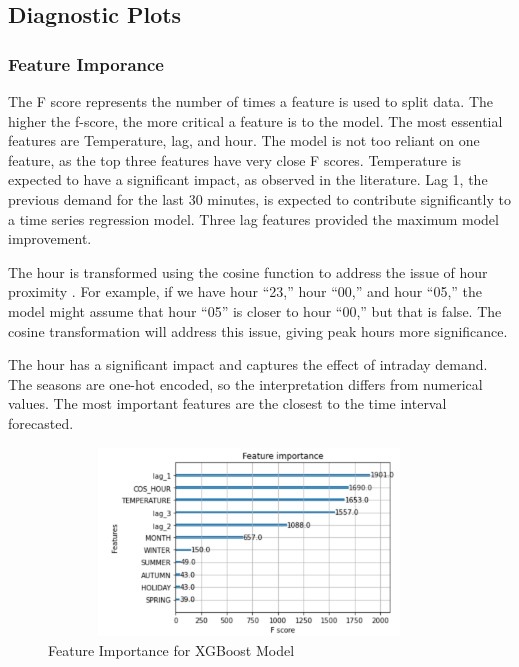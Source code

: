 \documentclass[mstat,12pt]{unswthesis}
\begin{document}
\subsection{Diagnostic Plots}\label{diagnostic-plots}

\subsubsection{Feature Imporance}\label{feature-imporance}

The F score represents the number of times a feature is used to split
data. The higher the f-score, the more critical a feature is to the
model. The most essential features are Temperature, lag, and hour. The
model is not too reliant on one feature, as the top three features have
very close F scores. Temperature is expected to have a significant
impact, as observed in the literature. Lag 1, the previous demand for
the last 30 minutes, is expected to contribute significantly to a time
series regression model. Three lag features provided the maximum model
improvement.

The hour is transformed using the cosine function to address the issue
of hour proximity \cite{avanwyk_2022_encoding}. For example, if we have
hour ``23,'' hour ``00,'' and hour ``05,'' the model might assume that
hour ``05'' is closer to hour ``00,'' but that is false. The cosine
transformation will address this issue, giving peak hours more
significance.

The hour has a significant impact and captures the effect of intraday
demand. The seasons are one-hot encoded, so the interpretation differs
from numerical values. The most important features are the closest to
the time interval forecasted.

\begin{figure}[H]
\centering
\includegraphics[width=0.95\textwidth, height=5cm]{featureimp.png}
\caption{Feature Importance for XGBoost Model}\label{featureimp}
\end{figure}
\end{document}
